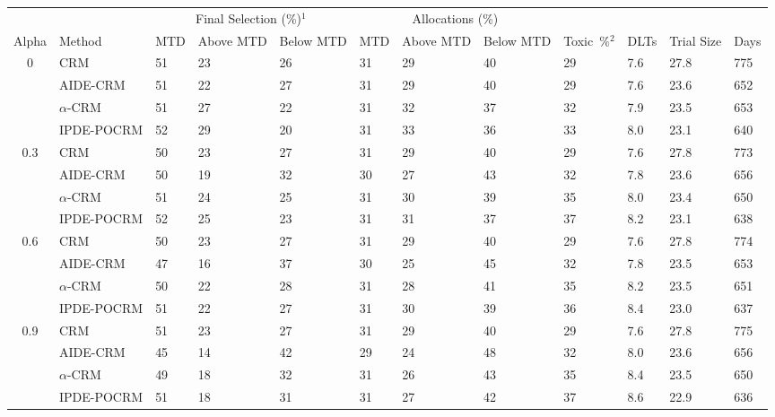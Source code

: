 \begin{tabular*}{\textwidth}{@{\extracolsep\fill}clllllllllll@{\extracolsep\fill}}
\toprule
&  & \multicolumn{3}{c}{Final Selection (\%)$^1$} & \multicolumn{3}{c}{Allocations (\%)} & &  &  &  \\
\multirow{2}{2em}{Alpha} & \multirow{2}{2em}{Method} & \multirow{2}{2em}{MTD} & \multirow{2}{2em}{Above MTD} & \multirow{2}{2em}{Below MTD} & \multirow{2}{2em}{MTD} & \multirow{2}{2em}{Above MTD} & \multirow{2}{2em}{Below MTD} & \multirow{2}{2em}{Toxic~\%$^2$} & \multirow{2}{2em}{DLTs} & \multirow{2}{2em}{Trial Size} & \multirow{2}{2em}{Days}  \\ \\ 
\midrule
\multirow{4}{2em}{0} & CRM & 51 & 23 & 26 & 31 & 29 & 40 & 29 & 7.6 & 27.8 & 775\\
 & AIDE-CRM & 51 & 22 & 27 & 31 & 29 & 40 & 29 & 7.6 & 23.6 & 652\\
 & $\alpha$-CRM & 51 & 27 & 22 & 31 & 32 & 37 & 32 & 7.9 & 23.5 & 653\\
 & IPDE-POCRM & 52 & 29 & 20 & 31 & 33 & 36 & 33 & 8.0 & 23.1 & 640\\
\midrule
\multirow{4}{2em}{0.3} & CRM & 50 & 23 & 27 & 31 & 29 & 40 & 29 & 7.6 & 27.8 & 773\\
 & AIDE-CRM & 50 & 19 & 32 & 30 & 27 & 43 & 32 & 7.8 & 23.6 & 656\\
 & $\alpha$-CRM & 51 & 24 & 25 & 31 & 30 & 39 & 35 & 8.0 & 23.4 & 650\\
 & IPDE-POCRM & 52 & 25 & 23 & 31 & 31 & 37 & 37 & 8.2 & 23.1 & 638\\
\midrule
\multirow{4}{2em}{0.6} & CRM & 50 & 23 & 27 & 31 & 29 & 40 & 29 & 7.6 & 27.8 & 774\\
 & AIDE-CRM & 47 & 16 & 37 & 30 & 25 & 45 & 32 & 7.8 & 23.5 & 653\\
 & $\alpha$-CRM & 50 & 22 & 28 & 31 & 28 & 41 & 35 & 8.2 & 23.5 & 651\\
 & IPDE-POCRM & 51 & 22 & 27 & 31 & 30 & 39 & 36 & 8.4 & 23.0 & 637\\
\midrule
\multirow{4}{2em}{0.9} & CRM & 51 & 23 & 27 & 31 & 29 & 40 & 29 & 7.6 & 27.8 & 775\\
 & AIDE-CRM & 45 & 14 & 42 & 29 & 24 & 48 & 32 & 8.0 & 23.6 & 656\\
 & $\alpha$-CRM & 49 & 18 & 32 & 31 & 26 & 43 & 35 & 8.4 & 23.5 & 650\\
 & IPDE-POCRM & 51 & 18 & 31 & 31 & 27 & 42 & 37 & 8.6 & 22.9 & 636\\
\bottomrule
\end{tabular*}
